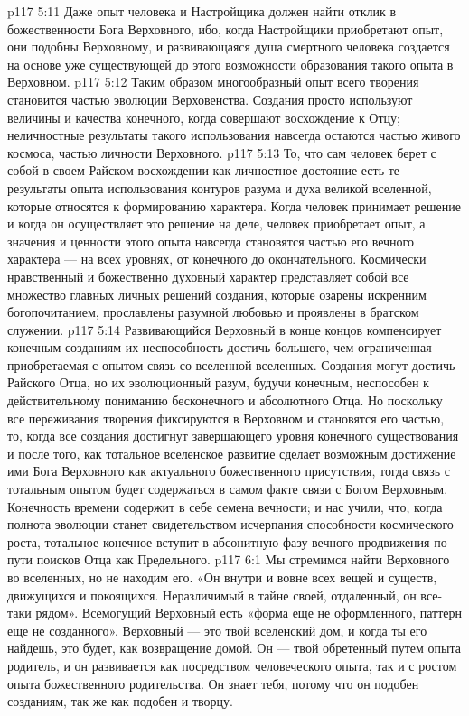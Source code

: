 \vs p117 5:11 Даже опыт человека и Настройщика должен найти отклик в божественности Бога Верховного, ибо, когда Настройщики приобретают опыт, они подобны Верховному, и развивающаяся душа смертного человека создается на основе уже существующей до этого возможности образования такого опыта в Верховном.
\vs p117 5:12 Таким образом многообразный опыт всего творения становится частью эволюции Верховенства. Создания просто используют величины и качества конечного, когда совершают восхождение к Отцу; неличностные результаты такого использования навсегда остаются частью живого космоса, частью личности Верховного.
\vs p117 5:13 То, что сам человек берет с собой в своем Райском восхождении как личностное достояние есть те результаты опыта использования контуров разума и духа великой вселенной, которые относятся к формированию характера. Когда человек принимает решение и когда он осуществляет это решение на деле, человек приобретает опыт, а значения и ценности этого опыта навсегда становятся частью его вечного характера --- на всех уровнях, от конечного до окончательного. Космически нравственный и божественно духовный характер представляет собой все множество главных личных решений создания, которые озарены искренним богопочитанием, прославлены разумной любовью и проявлены в братском служении.
\vs p117 5:14 Развивающийся Верховный в конце концов компенсирует конечным созданиям их неспособность достичь большего, чем ограниченная приобретаемая с опытом связь со вселенной вселенных. Создания могут достичь Райского Отца, но их эволюционный разум, будучи конечным, неспособен к действительному пониманию бесконечного и абсолютного Отца. Но поскольку все переживания творения фиксируются в Верховном и становятся его частью, то, когда все создания достигнут завершающего уровня конечного существования и после того, как тотальное вселенское развитие сделает возможным достижение ими Бога Верховного как актуального божественного присутствия, тогда связь с тотальным опытом будет содержаться в самом факте связи с Богом Верховным. Конечность времени содержит в себе семена вечности; и нас учили, что, когда полнота эволюции станет свидетельством исчерпания способности космического роста, тотальное конечное вступит в абсонитную фазу вечного продвижения по пути поисков Отца как Предельного.
\vs p117 6:1 Мы стремимся найти Верховного во вселенных, но не находим его. «Он внутри и вовне всех вещей и существ, движущихся и покоящихся. Неразличимый в тайне своей, отдаленный, он все\hyp{}таки рядом». Всемогущий Верховный есть «форма еще не оформленного, паттерн еще не созданного». Верховный --- это твой вселенский дом, и когда ты его найдешь, это будет, как возвращение домой. Он --- твой обретенный путем опыта родитель, и он развивается как посредством человеческого опыта, так и с ростом опыта божественного родительства. Он знает тебя, потому что он подобен созданиям, так же как подобен и творцу.
